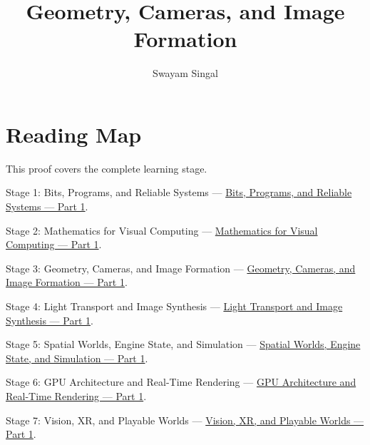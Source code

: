 \documentclass[11pt,twoside,openany]{book}
\title{Geometry, Cameras, and Image Formation}
\author{Swayam Singal}
\begin{document}
\maketitle
\begin{center}\end{center}
\chapter*{Reading Map}
\hypertarget{volume-reading-map}{}
\noindent This proof covers the complete learning stage.
\par\noindent Stage 1: Bits, Programs, and Reliable Systems --- \href{../01-Bits-Programs-and-Reliable-Systems-P01/main.pdf}{Bits, Programs, and Reliable Systems — Part 1}.
\par\noindent Stage 2: Mathematics for Visual Computing --- \href{../02-Mathematics-for-Visual-Computing-P01/main.pdf}{Mathematics for Visual Computing — Part 1}.
\par\noindent Stage 3: Geometry, Cameras, and Image Formation --- \href{../03-Geometry-Cameras-and-Image-Formation-P01/main.pdf}{Geometry, Cameras, and Image Formation — Part 1}.
\par\noindent Stage 4: Light Transport and Image Synthesis --- \href{../04-Light-Transport-and-Image-Synthesis-P01/main.pdf}{Light Transport and Image Synthesis — Part 1}.
\par\noindent Stage 5: Spatial Worlds, Engine State, and Simulation --- \href{../05-Spatial-Worlds-Engine-State-and-Simulation-P01/main.pdf}{Spatial Worlds, Engine State, and Simulation — Part 1}.
\par\noindent Stage 6: GPU Architecture and Real-Time Rendering --- \href{../06-GPU-Architecture-and-Real-Time-Rendering-P01/main.pdf}{GPU Architecture and Real-Time Rendering — Part 1}.
\par\noindent Stage 7: Vision, XR, and Playable Worlds --- \href{../07-Vision-XR-and-Playable-Worlds-P01/main.pdf}{Vision, XR, and Playable Worlds — Part 1}.
\tableofcontents
\mainmatter
\setcounter{chapter}{0}





\end{document}
